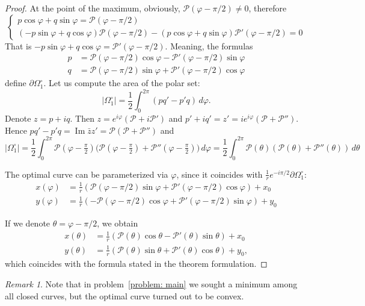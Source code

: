 \documentclass[a4paper,12pt]{article}
\newcommand {\PPP}{\mathcal{P}}
\theoremstyle{remark}
\newtheorem{remark}{Remark}
\theoremstyle{definition}
\begin{document}
\begin{proof}
	At the point of the maximum, obviously, $\PPP(\varphi-\pi/2) \neq 0$, therefore
	$$ \begin{cases} p \cos\varphi + q \sin\varphi = \PPP(\varphi-\pi/2) \\ (-p \sin\varphi + q \cos\varphi)\PPP(\varphi-\pi/2) - (p \cos\varphi + q \sin\varphi)\PPP'(\varphi-\pi/2) = 0 \end{cases} $$
	That is $-p \sin\varphi + q \cos\varphi = \PPP'(\varphi-\pi/2)$.
	Meaning, the formulas
	\begin{align*}
		p &= \PPP(\varphi-\pi/2)\cos\varphi - \PPP'(\varphi-\pi/2)\sin\varphi \\
		q &= \PPP(\varphi-\pi/2)\sin\varphi + \PPP'(\varphi-\pi/2)\cos\varphi
	\end{align*}
	define $\partial \Omega_1^\circ$. Let us compute the area of the polar set:
	$$
	|\Omega_1^\circ| = \frac12\int_0^{2\pi} (pq'-p'q)\,d\varphi.
	$$
	Denote $z=p+iq$. Then $z=e^{i\varphi}(\PPP+i\PPP')$ and $p'+iq'=z'=ie^{i\varphi}(\PPP+\PPP'')$. Hence $pq'-p'q=\operatorname{Im}\bar zz' = \PPP(\PPP+\PPP'')$ and
	$$
	|\Omega_1^\circ| = \frac12\int_0^{2\pi} \PPP(\varphi-\tfrac\pi2)\big(\PPP(\varphi-\tfrac\pi2)+\PPP''(\varphi-\tfrac\pi2)\big)\,d\varphi =
	\frac12\int_0^{2\pi} \PPP(\theta)(\PPP(\theta)+\PPP''(\theta))\,d\theta
	$$
	
	The optimal curve can be parameterized via $\varphi$, since it coincides with $\frac{1}{r}e^{-i\pi/2}\partial\Omega_1^\circ$:
	\begin{align*}
		x(\varphi) &= \frac{1}{r} \left( \PPP(\varphi-\pi/2)\sin\varphi + \PPP'(\varphi-\pi/2)\cos\varphi \right) + x_0 \\
		y(\varphi) &= \frac{1}{r} \left( -\PPP(\varphi-\pi/2)\cos\varphi + \PPP'(\varphi-\pi/2)\sin\varphi \right) + y_0
	\end{align*}
	
	If we denote $\theta = \varphi - \pi/2$, we obtain
	\begin{align*}
		x(\theta) &= \frac{1}{r} \left( \PPP(\theta)\cos\theta - \PPP'(\theta)\sin\theta \right) + x_0\\
		y(\theta) &= \frac{1}{r} \left( \PPP(\theta)\sin\theta + \PPP'(\theta)\cos\theta \right) + y_0,
	\end{align*}
	which coincides with the formula stated in the theorem formulation.
	
\end{proof}



\begin{remark}
	Note that in problem~\eqref{problem: main} we sought a minimum among all closed curves, but the optimal curve turned out to be convex.
\end{remark}
\end{document}
